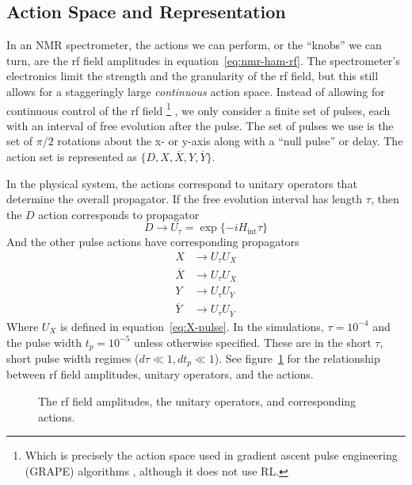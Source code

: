 \subsection{Action Space and Representation}

In an NMR spectrometer, the actions we can perform, or the ``knobs'' we can turn, are the rf field amplitudes in equation~\ref{eq:nmr-ham-rf}.
The spectrometer's electronics limit the strength and the granularity of the rf field,
but this still allows for a staggeringly large \emph{continuous} action space. Instead of allowing for continuous control of the rf field%
\footnote{
Which is precisely the action space used in gradient ascent pulse engineering (GRAPE) algorithms \cite{Khaneja-2005}, although it does not use RL.
}%
, we only consider a finite set of pulses, each with an interval of free evolution after the pulse. The set of pulses we use is the set of $\pi/2$ rotations about the x- or y-axis along with a ``null pulse'' or delay. The action set is represented as $\{ D, X, \overline{X}, Y, \overline{Y} \}$.



In the physical system, the actions correspond to unitary operators that determine the overall propagator. If the free evolution interval has length $\tau$, then the $D$ action corresponds to propagator
\[
D \longrightarrow U_{\tau} = \exp\{ -i H_{\text{int}} \tau \}
\]
And the other pulse actions have corresponding propagators
\begin{align*}
    X &\longrightarrow U_{\tau} U_X \\
    \overline{X} &\longrightarrow U_{\tau} U_{\overline{X}} \\
    Y & \longrightarrow U_{\tau} U_Y \\
    \overline{Y} &\longrightarrow U_{\tau} U_{\overline{Y}}
\end{align*}
Where $U_X$ is defined in equation~\ref{eq:X-pulse}. In the simulations, $\tau = 10^{-4}$ and the pulse width $t_p = 10^{-5}$ unless otherwise specified.
These are in the short $\tau$, short pulse width regimes ($d\tau \ll 1, d t_p \ll 1$).
See figure~\ref{fig:actions} for the relationship between rf field amplitudes, unitary operators, and the actions.

\begin{figure}[H]
    \centering
    
    \caption{The rf field amplitudes, the unitary operators, and corresponding actions.}
    \label{fig:actions}
\end{figure}

